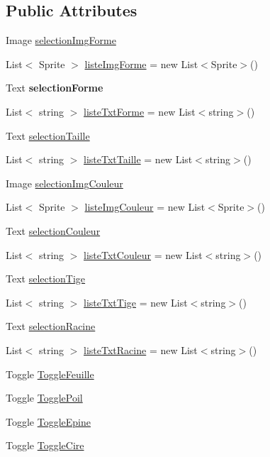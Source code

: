\subsection*{Public Attributes}
\begin{DoxyCompactItemize}
\item 
Image \mbox{\hyperlink{class_creation_plante_aad1d9f131a724a50d969d6430499bdd4}{selection\+Img\+Forme}}
\item 
List$<$ Sprite $>$ \mbox{\hyperlink{class_creation_plante_ad5cf2d31635537fb50f54385ca9de47c}{liste\+Img\+Forme}} = new List$<$Sprite$>$()
\item 
\mbox{\label{class_creation_plante_a5b05c1a4aa92069ef3b9044f712aff68}} 
Text {\bfseries selection\+Forme}
\item 
List$<$ string $>$ \mbox{\hyperlink{class_creation_plante_ada81f742baa7c361c307ef64d4d4b025}{liste\+Txt\+Forme}} = new List$<$string$>$()
\item 
Text \mbox{\hyperlink{class_creation_plante_af6fa7843abc268155014fedb1569cad9}{selection\+Taille}}
\item 
List$<$ string $>$ \mbox{\hyperlink{class_creation_plante_ac5dfac50234fda6051ae3d84f2b50528}{liste\+Txt\+Taille}} = new List$<$string$>$()
\item 
Image \mbox{\hyperlink{class_creation_plante_a9c26cdbc59b66caffd59daffa19a219a}{selection\+Img\+Couleur}}
\item 
List$<$ Sprite $>$ \mbox{\hyperlink{class_creation_plante_a5cab63a040429574497a79a7b4f92c21}{liste\+Img\+Couleur}} = new List$<$Sprite$>$()
\item 
Text \mbox{\hyperlink{class_creation_plante_a8040f9f2ce8745ed283438b77c2e6b91}{selection\+Couleur}}
\item 
List$<$ string $>$ \mbox{\hyperlink{class_creation_plante_a2590a9e6bccc8400a09f695da5d581b3}{liste\+Txt\+Couleur}} = new List$<$string$>$()
\item 
Text \mbox{\hyperlink{class_creation_plante_a44c69793318155ff88d68649e77194f7}{selection\+Tige}}
\item 
List$<$ string $>$ \mbox{\hyperlink{class_creation_plante_a98188293e42594b907545ac22434a905}{liste\+Txt\+Tige}} = new List$<$string$>$()
\item 
Text \mbox{\hyperlink{class_creation_plante_a4345e3a4e3c5aed7b93e5d97892d26c7}{selection\+Racine}}
\item 
List$<$ string $>$ \mbox{\hyperlink{class_creation_plante_a56f8ddf46f096dcfe343911b965ca9c4}{liste\+Txt\+Racine}} = new List$<$string$>$()
\item 
Toggle \mbox{\hyperlink{class_creation_plante_a921a3d594a984a3d101245fc05a16cf8}{Toggle\+Feuille}}
\item 
Toggle \mbox{\hyperlink{class_creation_plante_abf832f4a1aaf950d8dd40ed77492eb26}{Toggle\+Poil}}
\item 
Toggle \mbox{\hyperlink{class_creation_plante_a54ed8bd462d5ea9cb25c714a73f46c72}{Toggle\+Epine}}
\item 
Toggle \mbox{\hyperlink{class_creation_plante_ada23ec6b5096f8036385b20de8d3c783}{Toggle\+Cire}}
\end{DoxyCompactItemize}
